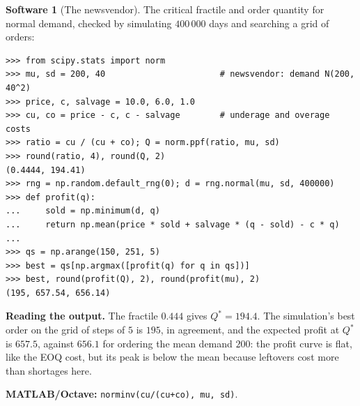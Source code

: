 \documentclass[11pt,a4paper]{article}
\numberwithin{equation}{section}
\theoremstyle{definition}
\newtheorem{software}[thm]{Software}
\begin{document}
\begin{software}[The newsvendor]
\label{sw:newsvendor}
The critical fractile and order quantity for normal demand, checked by simulating $400\,000$ days and searching a grid of orders:
{\small\begin{verbatim}
>>> from scipy.stats import norm
>>> mu, sd = 200, 40                       # newsvendor: demand N(200, 40^2)
>>> price, c, salvage = 10.0, 6.0, 1.0
>>> cu, co = price - c, c - salvage        # underage and overage costs
>>> ratio = cu / (cu + co); Q = norm.ppf(ratio, mu, sd)
>>> round(ratio, 4), round(Q, 2)
(0.4444, 194.41)
>>> rng = np.random.default_rng(0); d = rng.normal(mu, sd, 400000)
>>> def profit(q):
...     sold = np.minimum(d, q)
...     return np.mean(price * sold + salvage * (q - sold) - c * q)
...
>>> qs = np.arange(150, 251, 5)
>>> best = qs[np.argmax([profit(q) for q in qs])]
>>> best, round(profit(Q), 2), round(profit(mu), 2)
(195, 657.54, 656.14)
\end{verbatim}}
\textbf{Reading the output.} The fractile $0.444$ gives $Q^* = 194.4$. The simulation's best order on the grid of steps of $5$ is $195$, in agreement, and the expected profit at $Q^*$ is $657.5$, against $656.1$ for ordering the mean demand $200$: the profit curve is flat, like the EOQ cost, but its peak is below the mean because leftovers cost more than
shortages here.

\textbf{MATLAB/Octave:} \texttt{norminv(cu/(cu+co), mu, sd)}.
\end{software}
\end{document}
